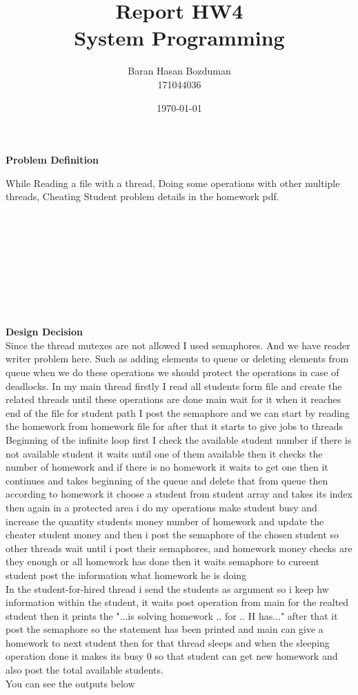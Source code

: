 \documentclass{report}
\title{\huge Report HW4 \\ \Huge System Programming}
\author{\huge Baran Hasan Bozduman\\ \huge 171044036}
\date{\today}
\begin{document}
\maketitle
{\huge \textbf{Problem Definition} \\}

{\large While Reading a file with a thread, Doing some operations with other multiple threads, Cheating Student problem details in the homework pdf.\\}\\\\\\\\\\\\\\\\\\

{\huge \textbf{Design Decision} \\ \large Since the thread mutexes are not allowed I used semaphores. And we have reader writer problem here. Such as adding elements to queue or deleting elements from queue when we do these operations we should protect the operations in case of deadlocks. In my main thread firstly I read all students form file and create the related threads until these operations are done main wait for it when it reaches end of the file for student path I post the semaphore and we can start by reading the homework from homework file for after that it starts to give jobs to threads\\
    Beginning of the infinite loop first I check the available student number if there is not available student it waits until one of them available then it checks the number of homework and if there is no homework it waits to get one then it continues and takes beginning of the queue and delete that from queue then according to homework it choose a student from student array and takes its index then again in a protected area i do my operations make student busy and increase the quantity students money number of homework and update the cheater student money and then i post the semaphore of the chosen student so other threads wait until i post their semaphores, and homework money checks are they enough or all homework has done then it waits semaphore to cureent student post the information what homework he is doing\\
    In the student-for-hired thread i send the students as argument so i keep hw information within the student, it waits post operation from main for the realted student then it prints the "...is solving  homework .. for .. H has..." after that it post the semaphore so the statement has been printed and main can give a homework to next student then for that thread sleeps and when the sleeping operation done it makes its busy 0 so that student can get new homework and also post the total available students.\\
    You can see the outputs below
}
\end{document}
